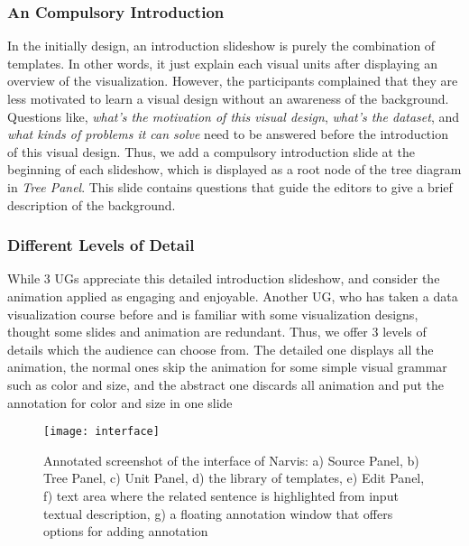 \subsubsection{An Compulsory Introduction}
In the initially design, an introduction slideshow is purely the combination of templates. In other words, it just explain each visual units after displaying an overview of the visualization. However, the participants complained that they are less motivated to learn a visual design without an awareness of the background. Questions like, \textit{what's the motivation of this visual design}, \textit{what's the dataset}, and \textit{what kinds of problems it can solve} need to be answered before the introduction of this visual design. Thus, we add a compulsory introduction slide at the beginning of each slideshow, which is displayed as a root node of the tree diagram in \textit{Tree Panel}. This slide contains questions that guide the editors to give a brief description of the background.
\subsubsection{Different Levels of Detail}
While 3 UGs appreciate this detailed introduction slideshow, and consider the animation applied as engaging and enjoyable. Another UG, who has taken a data visualization course before and is familiar with some visualization designs, thought some slides and animation are redundant. 
Thus, we offer 3 levels of details which the audience can choose from. The detailed one displays all the animation, the normal ones skip the animation for some simple visual grammar such as color and size, and the abstract one discards all animation and put the annotation for color and size in one slide
 
\begin{figure}
 \centering %
 \texttt{[image: interface]}
 \caption{Annotated screenshot of the interface of Narvis: a) Source Panel, b) Tree Panel, c) Unit Panel, d) the library of templates, e) Edit Panel, f) text area where the related sentence is highlighted from input textual description, g) a floating annotation window that offers options for adding annotation}
 \label{fig:interface}
\end{figure}

   
